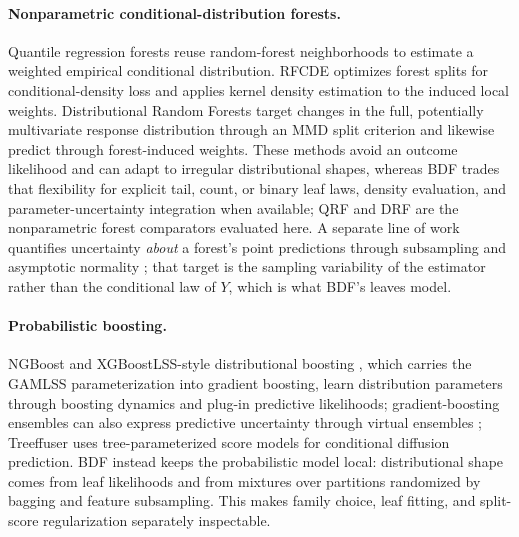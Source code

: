 \documentclass[10pt]{article} %
\begin{document}
\paragraph{Nonparametric conditional-distribution forests.}
Quantile regression forests \citep[QRF;][]{meinshausen2006quantile} reuse random-forest neighborhoods to estimate a weighted empirical conditional distribution. RFCDE \citep{pospisil2018rfcde} optimizes forest splits for conditional-density loss and applies kernel density estimation to the induced local weights. Distributional Random Forests \citep[DRF;][]{cevid2022distributional} target changes in the full, potentially multivariate response distribution through an MMD split criterion and likewise predict through forest-induced weights. These methods avoid an outcome likelihood and can adapt to irregular distributional shapes, whereas BDF trades that flexibility for explicit tail, count, or binary leaf laws, density evaluation, and parameter-uncertainty integration when available; QRF and DRF are the nonparametric forest comparators evaluated here. A separate line of work quantifies uncertainty \emph{about} a forest's point predictions through subsampling and asymptotic normality \citep{mentch2016quantifying}; that target is the sampling variability of the estimator rather than the conditional law of $Y$, which is what BDF's leaves model.

\paragraph{Probabilistic boosting.}
NGBoost \citep{duan2020ngboost} and XGBoostLSS-style distributional boosting \citep{marz2019xgboostlss}, which carries the GAMLSS parameterization \citep{rigby2005generalized} into gradient boosting, learn distribution parameters through boosting dynamics and plug-in predictive likelihoods; gradient-boosting ensembles can also express predictive uncertainty through virtual ensembles \citep{malinin2021uncertainty}; Treeffuser \citep{beltranvelez2024treeffuser} uses tree-parameterized score models for conditional diffusion prediction. BDF instead keeps the probabilistic model local: distributional shape comes from leaf likelihoods and from mixtures over partitions randomized by bagging and feature subsampling. This makes family choice, leaf fitting, and split-score regularization separately inspectable.
\end{document}

